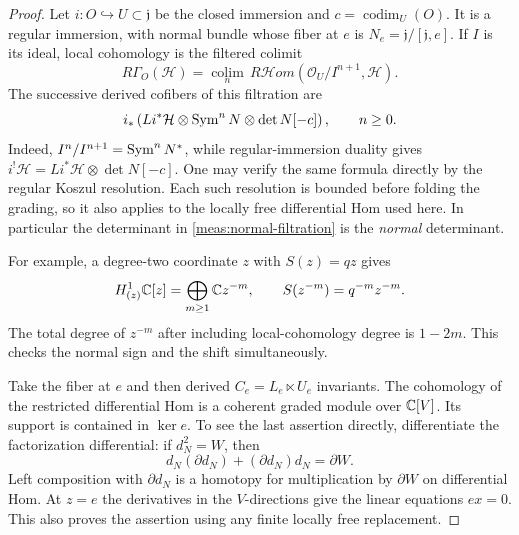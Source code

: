 \begin{proof}
Let $i:O\hookrightarrow U\subset\mathfrak j$ be the closed immersion and
$c=\operatorname{codim}_{U}(O)$.  It is a regular immersion, with normal
bundle whose fiber at $e$ is $N_e=\mathfrak j/[\mathfrak j,e]$.  If $I$ is
its ideal, local cohomology is the filtered colimit
\[
 R\Gamma_O(\mathcal H)
 =\underset{n}{\operatorname{colim}}\,
 R\mathcal H\!om(\mathcal O_U/I^{n+1},\mathcal H).
\]
The successive derived cofibers of this filtration are
\begin{equation}\label{meas:normal-filtration}
 i_*\left(Li^*\mathcal H\otimes\operatorname{Sym}^n N
                         \otimes\det N[-c]\right),\qquad n\geq0.
\end{equation}
Indeed, $I^n/I^{n+1}=\operatorname{Sym}^n N^*$, while regular-immersion duality gives
$i^!\mathcal H=Li^*\mathcal H\otimes\det N[-c]$.  One may verify the same
formula directly by the regular Koszul resolution.  Each such resolution
is bounded before folding the grading, so it also applies to the locally
free differential Hom used here.  In particular the determinant in
\eqref{meas:normal-filtration} is the \emph{normal} determinant.

For example, a degree-two coordinate $z$ with $S(z)=qz$ gives
\begin{equation}\label{meas:one-normal-coordinate}
 H^1_{(z)}\mathbb C[z]=\bigoplus_{m\geq1}\mathbb C z^{-m},
 \qquad S(z^{-m})=q^{-m}z^{-m}.
\end{equation}
The total degree of $z^{-m}$ after including local-cohomology degree is
$1-2m$.  This checks the normal sign and the shift simultaneously.

Take the fiber at $e$ and then derived $C_e=L_e\ltimes U_e$ invariants.
The cohomology of the restricted differential Hom is a coherent graded
module over $\mathbb C[V]$.  Its support is contained in $\ker e$.  To see the
last assertion directly, differentiate the factorization differential:
if $d_N^2=W$, then
\[
 d_N(\partial d_N)+(\partial d_N)d_N=\partial W.
\]
Left composition with $\partial d_N$ is a homotopy for multiplication by
$\partial W$ on differential Hom.  At $z=e$ the derivatives in the
$V$-directions give the linear equations $ex=0$.  This also proves the
assertion using any finite locally free replacement.


\end{proof}
